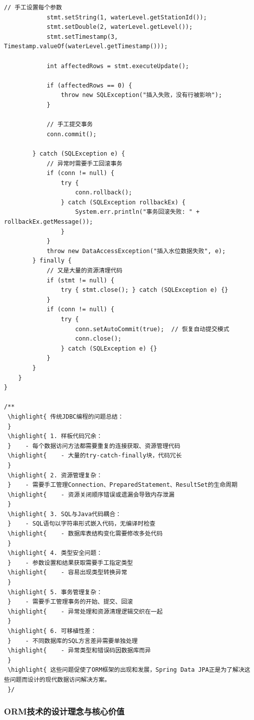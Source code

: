 \begin{lstlisting}[style=java]
            // 手工设置每个参数
            stmt.setString(1, waterLevel.getStationId());
            stmt.setDouble(2, waterLevel.getLevel());
            stmt.setTimestamp(3, Timestamp.valueOf(waterLevel.getTimestamp()));
            
            int affectedRows = stmt.executeUpdate();
            
            if (affectedRows == 0) {
                throw new SQLException("插入失败，没有行被影响");
            }
            
            // 手工提交事务
            conn.commit();
            
        } catch (SQLException e) {
            // 异常时需要手工回滚事务
            if (conn != null) {
                try {
                    conn.rollback();
                } catch (SQLException rollbackEx) {
                    System.err.println("事务回滚失败: " + rollbackEx.getMessage());
                }
            }
            throw new DataAccessException("插入水位数据失败", e);
        } finally {
            // 又是大量的资源清理代码
            if (stmt != null) {
                try { stmt.close(); } catch (SQLException e) {}
            }
            if (conn != null) {
                try { 
                    conn.setAutoCommit(true);  // 恢复自动提交模式
                    conn.close(); 
                } catch (SQLException e) {}
            }
        }
    }
}

/**
 \highlight{ 传统JDBC编程的问题总结：
 } 
 \highlight{ 1. 样板代码冗余：
 }    - 每个数据访问方法都需要重复的连接获取、资源管理代码
 \highlight{    - 大量的try-catch-finally块，代码冗长
 } 
 \highlight{ 2. 资源管理复杂：
 }    - 需要手工管理Connection、PreparedStatement、ResultSet的生命周期
 \highlight{    - 资源关闭顺序错误或遗漏会导致内存泄漏
 } 
 \highlight{ 3. SQL与Java代码耦合：
 }    - SQL语句以字符串形式嵌入代码，无编译时检查
 \highlight{    - 数据库表结构变化需要修改多处代码
 } 
 \highlight{ 4. 类型安全问题：
 }    - 参数设置和结果获取需要手工指定类型
 \highlight{    - 容易出现类型转换异常
 } 
 \highlight{ 5. 事务管理复杂：
 }    - 需要手工管理事务的开始、提交、回滚
 \highlight{    - 异常处理和资源清理逻辑交织在一起
 } 
 \highlight{ 6. 可移植性差：
 }    - 不同数据库的SQL方言差异需要单独处理
 \highlight{    - 异常类型和错误码因数据库而异
 } 
 \highlight{ 这些问题促使了ORM框架的出现和发展，Spring Data JPA正是为了解决这些问题而设计的现代数据访问解决方案。
 }/
\end{lstlisting}

\hypertarget{ormux6280ux672fux7684ux8bbeux8ba1ux7406ux5ff5ux4e0eux6838ux5fc3ux4ef7ux503c}{%
\subsubsection{ORM技术的设计理念与核心价值}\label{ormux6280ux672fux7684ux8bbeux8ba1ux7406ux5ff5ux4e0eux6838ux5fc3ux4ef7ux503c}}

